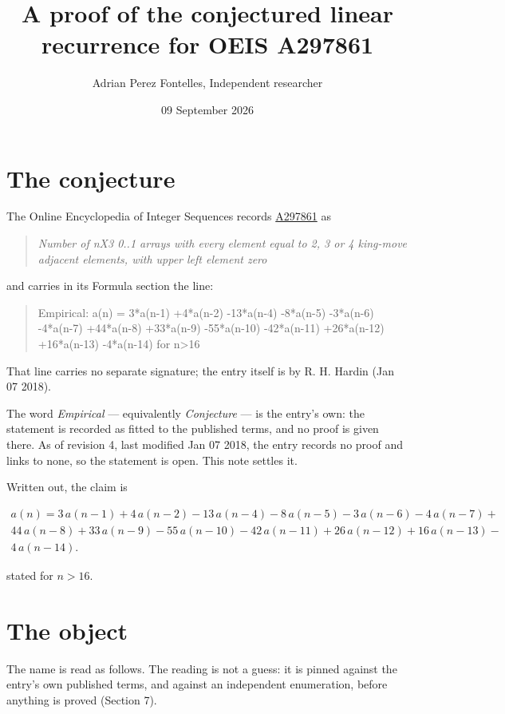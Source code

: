 \documentclass[11pt]{article}
\title{A proof of the conjectured linear recurrence for OEIS A297861}
\author{Adrian Perez Fontelles, Independent researcher}
\date{09 September 2026}
\theoremstyle{definition}
\begin{document}
\maketitle
\section{The conjecture}

The Online Encyclopedia of Integer Sequences records \href{https://oeis.org/A297861}{A297861} as

\begin{quote}\itshape Number of nX3 0..1 arrays with every element equal to 2, 3 or 4 king-move adjacent elements, with upper left element zero\end{quote}

and carries in its Formula section the line:

\begin{quote}\ttfamily Empirical: a(n) = 3*a(n-1) +4*a(n-2) -13*a(n-4) -8*a(n-5) -3*a(n-6) -4*a(n-7) +44*a(n-8) +33*a(n-9) -55*a(n-10) -42*a(n-11) +26*a(n-12) +16*a(n-13) -4*a(n-14) for n>16\end{quote}

That line carries no separate signature; the entry itself is by R. H. Hardin (Jan 07 2018).

The word {\itshape Empirical} --- equivalently {\itshape Conjecture} --- is the entry's own: the statement is recorded as fitted to the published terms, and no proof is given there. As of revision 4, last modified Jan 07 2018, the entry records no proof and links to none, so the statement is open. This note settles it.

Written out, the claim is

\begin{multline*} a(n) = 3\,a(n-1) + 4\,a(n-2) - 13\,a(n-4) - 8\,a(n-5) - 3\,a(n-6) - 4\,a(n-7) + \\ 44\,a(n-8) + 33\,a(n-9) - 55\,a(n-10) - 42\,a(n-11) + 26\,a(n-12) + 16\,a(n-13) - \\ 4\,a(n-14). \end{multline*}

stated for $n > 16$.

\section{The object}

The name is read as follows. The reading is not a guess: it is pinned against the entry's own published terms, and against an independent enumeration, before anything is proved (Section 7).
\end{document}
